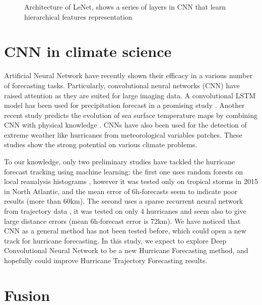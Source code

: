 \begin{figure}
	\begin{center}
		\hsize {}
	\end{center}
	\caption{Architecture of LeNet, shows a series of layers in CNN that learn hierarchical features representation \cite{lecun1998gradient} }
	\label{fig:LeNet}
\end{figure}


\section{CNN in climate science}
 Artificial Neural Network have recently shown their efficacy in a various number of forecasting tasks. Particularly, convolutional neural networks (CNN) have raised attention as they are suited for large imaging data. A convolutional LSTM model has been used for precipitation forecast in a promising study \cite{xingjian2015convolutional}. Another recent study predicts the evolution of sea surface temperature maps by combining CNN with physical knowledge \cite{de2017deep}. CNNs have also been used for the detection of extreme weather like hurricanes from meteorological variables patches\cite{racah2017extremeweather}. These studies show the strong potential on various climate problems. 

To our knowledge, only two preliminary studies have tackled the hurricane forecast tracking using machine learning: the first one uses random forests on local reanalysis histograms \cite{liberge2011prevision}, however it was tested only on tropical storms in 2015 in North Atlantic, and the mean error of 6h-forecasts seem to indicate poor results (more than 60km). The second uses a sparse recurrent neural network from trajectory data \cite{moradi2016sparse}, it was tested on only 4 hurricanes and seem also to give large distance errors (mean 6h-forecast error is 72km). We have noticed that CNN as a general method has not been tested before, which could open a new track for hurricane forecasting. In this study, we expect to explore Deep Convolutional Neural Network to be a new Hurricane Forecasting method, and hopefully could improve Hurricane Trajectory Forecasting results.

\section{Fusion}


